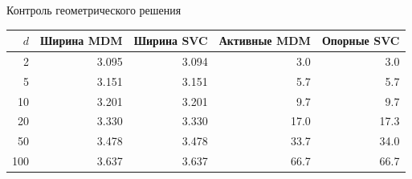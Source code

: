 \SPBGContentSlide
  {Контроль геометрического решения}
  {%
    \centering
    \Body
    \renewcommand{\arraystretch}{1.2}
    \setlength{\tabcolsep}{9pt}
    \begin{tabular}{|r|r|r|r|r|}
      \hline
      $d$ & Ширина MDM & Ширина SVC & Активные MDM & Опорные SVC \\
      \hline
      2 & 3.095 & 3.094 & 3.0 & 3.0 \\
      \hline
      5 & 3.151 & 3.151 & 5.7 & 5.7 \\
      \hline
      10 & 3.201 & 3.201 & 9.7 & 9.7 \\
      \hline
      20 & 3.330 & 3.330 & 17.0 & 17.3 \\
      \hline
      50 & 3.478 & 3.478 & 33.7 & 34.0 \\
      \hline
      100 & 3.637 & 3.637 & 66.7 & 66.7 \\
      \hline
    \end{tabular}
  }
